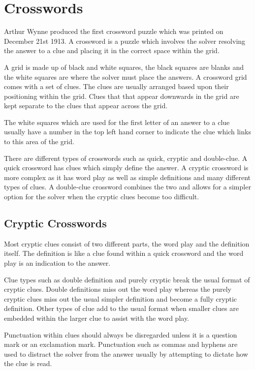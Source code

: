 \section{Crosswords}

Arthur Wynne produced the first crossword puzzle which was printed on December
21st 1913. A crossword is a puzzle which involves the solver resolving the
answer to a clue and placing it in the correct space within the grid. 

A grid is made up of black and white squares, the black squares are blanks and 
the white squares are where the solver must place the answers. A crossword grid 
comes with a set of clues. The clues are usually arranged based upon their 
positioning within the grid. Clues that that appear downwards in the grid are kept 
separate to the clues that appear across the grid. 

The white squares which are used for the first letter of an answer to a clue 
usually have a number in the top left hand corner to indicate the clue which 
links to this area of the grid.

There are different types of crosswords such as quick, cryptic and double-clue.
A quick crossword has clues which simply define the answer. A cryptic crossword
is more complex as it has word play as well as simple definitions and many
different types of clues. A double-clue crossword combines the two and allows
for a simpler option for the solver when the cryptic clues become too difficult.


\subsection{Cryptic Crosswords} 

Most cryptic clues consist of two different parts, the word play and the
definition itself. The definition is like a clue found within a quick crossword
and the word play is an indication to the answer.

Clue types such as double definition and purely cryptic break the usual format
of cryptic clues. Double definitions miss out the word play whereas the purely
cryptic clues miss out the usual simpler definition and become a fully cryptic
definition. Other types of clue add to the usual format when smaller clues are
embedded within the larger clue to assist with the word play.

Punctuation within clues should always be disregarded unless it is a question
mark or an exclamation mark. Punctuation such as commas and hyphens are used to
distract the solver from the answer usually by attempting to dictate how the
clue is read.

